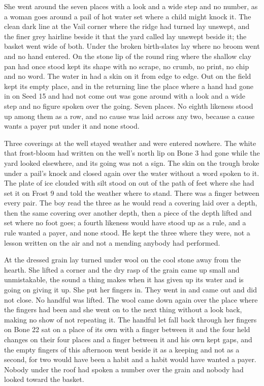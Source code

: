 She went around the seven places with a look and a wide step and no number, as a woman goes around a pail of hot water set where a child might knock it. The clean dark line at the Vail corner where the  ridge had turned lay unswept, and the finer grey hairline beside it that the yard called  lay unswept beside it; the basket went wide of both. Under  the broken birth-slates lay where no broom went and no hand entered. On the stone lip of  the round ring where the shallow clay pan had once stood kept its shape with no scrape, no crumb, no print, no chip and no word. The water in  had a skin on it from edge to edge. Out on  the field kept its empty place, and in the returning line the place where a hand had gone in on Seed 15 and had not come out was gone around with a look and a wide step and no figure spoken over the going. Seven places. No eighth likeness stood up among them as a row, and no cause was laid across any two, because a cause wants a payer put under it and none stood.

Three coverings at the well stayed weather and were entered nowhere. The white that frost-bloom had written on the well's north lip on Bone 3 had gone while the yard looked elsewhere, and its going was not a sign. The skin on the trough broke under a pail's knock and closed again over the water without a word spoken to it. The plate of ice clouded with silt stood on  out of the path of feet where she had set it on Frost 9 and told the weather where to stand. There was a finger between every pair. The boy read the three as he would read a covering laid over a depth, then the same covering over another depth, then a piece of the depth lifted and set where no foot goes; a fourth likeness would have stood up as a rule, and a rule wanted a payer, and none stood. He kept the three where they were, not a lesson written on the air and not a mending anybody had performed.

At  the dressed grain lay turned under wool on the cool stone away from the hearth. She lifted a corner and the dry rasp of the grain came up small and unmistakable, the sound a thing makes when it has given up its water and is going on giving it up. She put her fingers in. They went in and came out and did not close. No handful was lifted. The wool came down again over the place where the fingers had been and she went on to the next thing without a look back, making no show of not repeating it. The handful let fall back through her fingers on Bone 22 sat on a place of its own with a finger between it and the four held changes on their four places and a finger between it and his own kept gaps, and the empty fingers of this afternoon went beside it as a keeping and not as a second, for two would have been a habit and a habit would have wanted a payer. Nobody under the roof had spoken a number over the grain and nobody had looked toward the basket.

